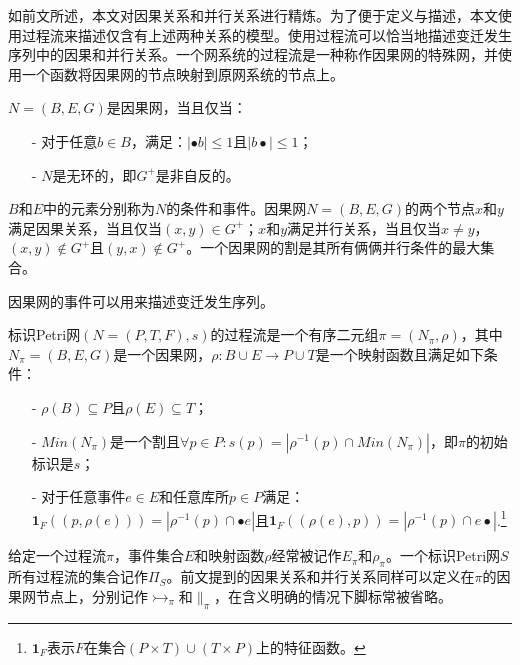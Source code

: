 如前文所述，本文对因果关系和并行关系进行精炼。为了便于定义与描述，本文使用过程流来描述仅含有上述两种关系的模型。使用过程流可以恰当地描述变迁发生序列中的因果和并行关系。一个网系统的过程流是一种称作因果网的特殊网，并使用一个函数将因果网的节点映射到原网系统的节点上。

\begin{definition}\label{def:causal_net}
$N=(B,E,G)$是因果网，当且仅当：
  \begin{itemize}
  	\item[-] 对于任意$b\in B$，满足：$|\bullet b|\leq 1$且$|b\bullet|\leq 1$；
  	\item[-] $N$是无环的，即$G^{+}$是非自反的。
  \end{itemize}
\end{definition}

$B$和$E$中的元素分别称为$N$的条件和事件。因果网$N=(B,E,G)$的两个节点$x$和$y$满足因果关系，当且仅当$(x,y)\in G^{+}$；$x$和$y$满足并行关系，当且仅当$x\neq y$，$(x,y)\notin G^{+}$且$(y,x)\notin G^{+}$。一个因果网的割是其所有俩俩并行条件的最大集合。

因果网的事件可以用来描述变迁发生序列。

\begin{definition}\label{def:process_run}
标识Petri网$(N=(P,T,F),s)$的过程流是一个有序二元组$\pi=(N_{\pi},\rho)$，其中$N_{\pi}=(B,E,G)$是一个因果网，$\rho:B\cup E\rightarrow P\cup T$是一个映射函数且满足如下条件：
  \begin{itemize}
  	\item[-] $\rho(B)\subseteq P$且$\rho(E)\subseteq T$；
  	\item[-] $Min(N_{\pi})$是一个割且$\forall p\in P:s(p)=|\rho^{-1}(p)\cap Min(N_{\pi})|$，即$\pi$的初始标识是$s$；
  	\item[-] 对于任意事件$e\in E$和任意库所$p\in P$满足：$\bm{1}_{F}((p,\rho(e)))=|\rho^{-1}(p)\cap\bullet e|$且$\bm{1}_{F}((\rho(e),p))=|\rho^{-1}(p)\cap e\bullet|$.\footnote{$\bm{1}_{F}$表示$F$在集合$(P\times T)\cup(T\times P)$上的特征函数。}
  \end{itemize}
\end{definition}

给定一个过程流$\pi$，事件集合$E$和映射函数$\rho$经常被记作$E_{\pi}$和$\rho_{\pi}$。一个标识Petri网$S$所有过程流的集合记作$\Pi_{S}$。前文提到的因果关系和并行关系同样可以定义在$\pi$的因果网节点上，分别记作$\rightarrowtail_{\pi}$和$\parallel_{\pi}$，在含义明确的情况下脚标常被省略。

